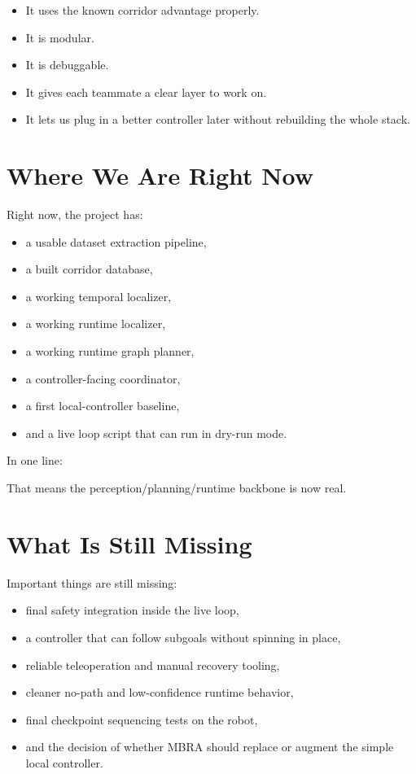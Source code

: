\documentclass[11pt,a4paper]{article}
\begin{document}
\begin{itemize}[nosep]
  \item It uses the known corridor advantage properly.
  \item It is modular.
  \item It is debuggable.
  \item It gives each teammate a clear layer to work on.
  \item It lets us plug in a better controller later without rebuilding the
        whole stack.
\end{itemize}


\section{Where We Are Right Now}

Right now, the project has:

\begin{itemize}[nosep]
  \item a usable dataset extraction pipeline,
  \item a built corridor database,
  \item a working temporal localizer,
  \item a working runtime localizer,
  \item a working runtime graph planner,
  \item a controller-facing coordinator,
  \item a first local-controller baseline,
  \item and a live loop script that can run in dry-run mode.
\end{itemize}

In one line:

\begin{center}
\end{center}

That means the perception/planning/runtime backbone is now real.


\section{What Is Still Missing}

Important things are still missing:

\begin{itemize}[nosep]
  \item final safety integration inside the live loop,
  \item a controller that can follow subgoals without spinning in place,
  \item reliable teleoperation and manual recovery tooling,
  \item cleaner no-path and low-confidence runtime behavior,
  \item final checkpoint sequencing tests on the robot,
  \item and the decision of whether MBRA should replace or augment the simple
        local controller.
\end{itemize}
\end{document}
